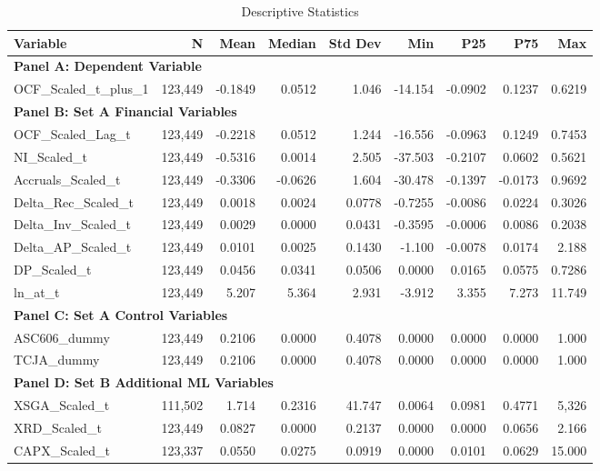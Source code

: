 \begin{table}[htbp]
\centering
\caption{Descriptive Statistics}
\label{tab:descriptive_stats}
\begin{adjustbox}{width=\textwidth}
\begin{tabular}{lrrrrrrrr}
\toprule
Variable & N & Mean & Median & Std Dev & Min & P25 & P75 & Max \\
\midrule
\multicolumn{9}{l}{\textbf{Panel A: Dependent Variable}} \\
OCF\_Scaled\_t\_plus\_1 & 123,449 & -0.1849 & 0.0512 & 1.046 & -14.154 & -0.0902 & 0.1237 & 0.6219 \\
\midrule
\multicolumn{9}{l}{\textbf{Panel B: Set A Financial Variables}} \\
OCF\_Scaled\_Lag\_t & 123,449 & -0.2218 & 0.0512 & 1.244 & -16.556 & -0.0963 & 0.1249 & 0.7453 \\
NI\_Scaled\_t & 123,449 & -0.5316 & 0.0014 & 2.505 & -37.503 & -0.2107 & 0.0602 & 0.5621 \\
Accruals\_Scaled\_t & 123,449 & -0.3306 & -0.0626 & 1.604 & -30.478 & -0.1397 & -0.0173 & 0.9692 \\
Delta\_Rec\_Scaled\_t & 123,449 & 0.0018 & 0.0024 & 0.0778 & -0.7255 & -0.0086 & 0.0224 & 0.3026 \\
Delta\_Inv\_Scaled\_t & 123,449 & 0.0029 & 0.0000 & 0.0431 & -0.3595 & -0.0006 & 0.0086 & 0.2038 \\
Delta\_AP\_Scaled\_t & 123,449 & 0.0101 & 0.0025 & 0.1430 & -1.100 & -0.0078 & 0.0174 & 2.188 \\
DP\_Scaled\_t & 123,449 & 0.0456 & 0.0341 & 0.0506 & 0.0000 & 0.0165 & 0.0575 & 0.7286 \\
ln\_at\_t & 123,449 & 5.207 & 5.364 & 2.931 & -3.912 & 3.355 & 7.273 & 11.749 \\
\midrule
\multicolumn{9}{l}{\textbf{Panel C: Set A Control Variables}} \\
ASC606\_dummy & 123,449 & 0.2106 & 0.0000 & 0.4078 & 0.0000 & 0.0000 & 0.0000 & 1.000 \\
TCJA\_dummy & 123,449 & 0.2106 & 0.0000 & 0.4078 & 0.0000 & 0.0000 & 0.0000 & 1.000 \\
\midrule
\multicolumn{9}{l}{\textbf{Panel D: Set B Additional ML Variables}} \\
XSGA\_Scaled\_t & 111,502 & 1.714 & 0.2316 & 41.747 & 0.0064 & 0.0981 & 0.4771 & 5,326 \\
XRD\_Scaled\_t & 123,449 & 0.0827 & 0.0000 & 0.2137 & 0.0000 & 0.0000 & 0.0656 & 2.166 \\
CAPX\_Scaled\_t & 123,337 & 0.0550 & 0.0275 & 0.0919 & 0.0000 & 0.0101 & 0.0629 & 15.000 \\

\end{tabular}
\end{adjustbox}
\end{table}
